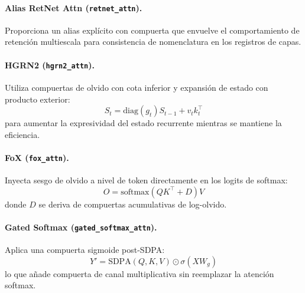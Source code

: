\documentclass[11pt,a4paper]{article}
\begin{document}
\paragraph{Alias RetNet Attn (\texttt{retnet\_attn}).}
Proporciona un alias explícito con compuerta que envuelve el comportamiento de retención multiescala para consistencia de nomenclatura en los registros de capas.
\citep{sun_retentive_2023}

\paragraph{HGRN2 (\texttt{hgrn2\_attn}).}
Utiliza compuertas de olvido con cota inferior y expansión de estado con producto exterior:
\[
S_t=\text{diag}(g_t)S_{t-1}+v_tk_t^\top
\]
para aumentar la expresividad del estado recurrente mientras se mantiene la eficiencia.
\citep{qin_hgrn2_2024}

\paragraph{FoX (\texttt{fox\_attn}).}
Inyecta sesgo de olvido a nivel de token directamente en los logits de softmax:
\[
O=\text{softmax}(QK^\top + D)V
\]
donde $D$ se deriva de compuertas acumulativas de log-olvido.
\citep{lin_forgetting_transformer_2025}

\paragraph{Gated Softmax (\texttt{gated\_softmax\_attn}).}
Aplica una compuerta sigmoide post-SDPA:
\[
Y'=\text{SDPA}(Q,K,V)\odot \sigma(XW_g)
\]
lo que añade compuerta de canal multiplicativa sin reemplazar la atención softmax.
\citep{qiu_gated_attention_2025}
\end{document}
